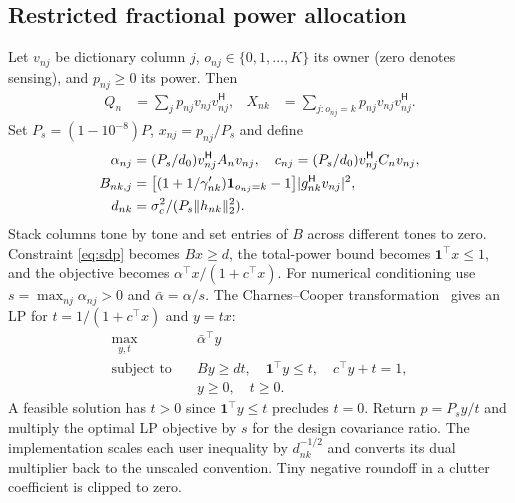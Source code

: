 \documentclass[journal]{IEEEtran}
\newcommand{\Hh}{^{\mathsf H}}
\newcommand{\norm}[1]{\lVert #1\rVert}
\begin{document}
\subsection{Restricted fractional power allocation}
Let $v_{nj}$ be dictionary column $j$, $o_{nj}\in\{0,1,\ldots,K\}$ its owner (zero denotes sensing), and $p_{nj}\ge0$ its power. Then
\begin{align}
 Q_n&=\sum_j p_{nj}v_{nj}v_{nj}\Hh,&
 X_{nk}&=\sum_{j:o_{nj}=k}p_{nj}v_{nj}v_{nj}\Hh .
 \label{eq:dict}
\end{align}
Set $P_s=(1-10^{-8})P$, $x_{nj}=p_{nj}/P_s$ and define
\begin{align}
 \alpha_{nj}&=(P_s/d_0)v_{nj}\Hh A_nv_{nj},\quad
 c_{nj}=(P_s/d_0)v_{nj}\Hh C_nv_{nj},\notag\\
 B_{nk,j}&=\big[(1+1/\gamma'_{nk}){\bf1}_{o_{nj}=k}-1\big]
              |g_{nk}\Hh v_{nj}|^2,\\
 d_{nk}&=\sigma_c^2/(P_s\norm{h_{nk}}_2^2).
\end{align}
Stack columns tone by tone and set entries of $B$ across different tones to zero. Constraint \eqref{eq:sdp} becomes $Bx\ge d$, the total-power bound becomes $\mathbf1^\top x\le1$, and the objective becomes $\alpha^\top x/(1+c^\top x)$. For numerical conditioning use $s=\max_{nj}\alpha_{nj}>0$ and $\bar\alpha=\alpha/s$. The Charnes--Cooper transformation~\cite{charnes} gives an LP for $t=1/(1+c^\top x)$ and $y=tx$:
\begin{subequations}\label{eq:lp}
\begin{align}
 \max_{y,t}\quad &\bar\alpha^\top y\\
 \text{subject to}\quad
 &By\ge dt,\quad\mathbf1^\top y\le t,\quad c^\top y+t=1,\\
 &y\ge0,\quad t\ge0 .
\end{align}
\end{subequations}
A feasible solution has $t>0$ since $\mathbf1^\top y\le t$ precludes $t=0$. Return $p=P_s y/t$ and multiply the optimal LP objective by $s$ for the design covariance ratio. The implementation scales each user inequality by $d_{nk}^{-1/2}$ and converts its dual multiplier back to the unscaled convention. Tiny negative roundoff in a clutter coefficient is clipped to zero.
\end{document}
